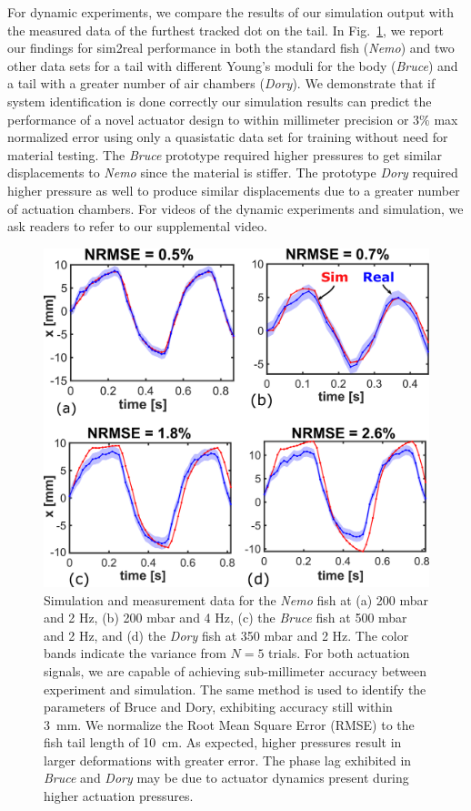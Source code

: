 For dynamic experiments, we compare the results of our simulation output with the measured data of the furthest tracked dot on the tail. In Fig.~\ref{fig:results}, we report our findings for sim2real performance in both the standard fish (\emph{Nemo}) and two other data sets for a tail with different Young's moduli for the body (\emph{Bruce}) and a tail with a greater number of air chambers (\emph{Dory}). We demonstrate that if system identification is done correctly our simulation results can predict the performance of a novel actuator design to within millimeter precision or $3\%$ max normalized error using only a quasistatic data set for training without need for material testing. The \textit{Bruce} prototype required higher pressures to get similar displacements to \textit{Nemo} since the material is stiffer. The prototype \textit{Dory} required higher pressure as well to produce similar displacements due to a greater number of actuation chambers. For videos of the dynamic experiments and simulation, we ask readers to refer to our supplemental video.

\begin{figure}[t]
    \centering
    \includegraphics[width=0.85\columnwidth]{figures/dynamic_actuation_square.png}
    \caption{Simulation and measurement data for the \emph{Nemo} fish at (a) 200 mbar and 2 Hz, (b) 200 mbar and 4 Hz, (c) the \emph{Bruce} fish at 500 mbar and 2 Hz, and (d) the \emph{Dory} fish at 350 mbar and 2 Hz. The color bands indicate the variance from $N=5$ trials. For both actuation signals, we are capable of achieving sub-millimeter accuracy between experiment and simulation. The same method is used to identify the parameters of Bruce and Dory, exhibiting accuracy still within \SI{3}{mm}. We normalize the Root Mean Square Error (RMSE) to the fish tail length of \SI{10}{cm}. As expected, higher pressures result in larger deformations with greater error. The phase lag exhibited in \emph{Bruce} and \emph{Dory} may be due to actuator dynamics present during higher actuation pressures.}
    \label{fig:results}
    \vspace{-3pt}
\end{figure}


